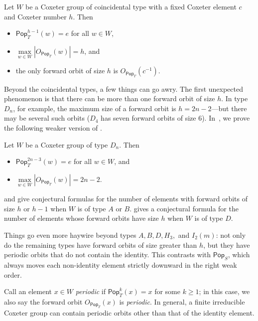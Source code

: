 \documentclass[ALCO,ThmDefs,Unicode,epreuves]{cedram}
\newcommand{\darkblue}{\color{darkblue}}
\newcommand{\defn}[1]{\emph{\darkblue #1}}
\newcommand{\pop}{\mathsf{Pop}}
\begin{document}
\begin{theorem}
\label{thm:main1}
Let $W$ be a Coxeter group of coincidental type with a fixed Coxeter element $c$ and Coxeter number $h$. Then 
\begin{itemize}
    \item $\pop_T^{h-1}(w)=e$ for all $w\in W$,
    \item  $\max\limits _{w\in W}\left|O_{\pop_T}(w)\right|=h$, and
    \item the only forward orbit of size $h$ is $O_{\pop_T}(c^{-1})$. 
\end{itemize}
\end{theorem}

Beyond the coincidental types, a few things can go awry.  The first unexpected phenomenon is that there can be more than one forward orbit of size $h$.  In type $D_n$, for example, the maximum size of a forward orbit is $h=2n-2$---but there may be several such orbits ($D_4$ has seven forward orbits of size $6$).  In~, we prove the following weaker version of . 


\begin{theorem}
\label{thm:main2}
Let $W$ be a Coxeter group of type $D_n$. Then 
\begin{itemize}
    \item $\pop_T^{2n-3}(w)=e$ for all $w\in W$, and
    \item  $\max\limits _{w\in W}\left|O_{\pop_T}(w)\right|=2n-2$.
\end{itemize}
\end{theorem}

 and  give conjectural formulas for the number of elements with forward orbits of size $h$ or $h-1$ when $W$ is of type $A$ or $B$.  gives a conjectural formula for the number of elements whose forward orbits have size $h$ when $W$ is of type $D$. 

Things go even more haywire beyond types $A,B,D,H_3,$ and $I_2(m)$: not only do the remaining types have forward orbits of size greater than $h$, but they have periodic orbits that do not contain the identity.  This contrasts with $\pop_S$, which always moves each non-identity element strictly downward in the right weak order. 

Call an element $x\in W$ \defn{periodic} if $\pop_T^k(x)=x$ for some $k\geq 1$; in this case, we also say the forward orbit $O_{\pop_T}(x)$ is \defn{periodic}. In general, a finite irreducible Coxeter group can contain periodic orbits other than that of the identity element.
\end{document}
